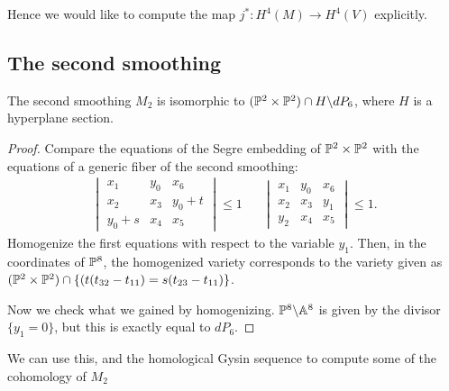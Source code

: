 \documentclass[11pt, english]{article}
\begin{document}
Hence we would like to compute the map $j^\ast: H^4(M) \to H^4(V)$ explicitly.

\subsection{The second smoothing}

\begin{prop}
The second smoothing $M_2$ is isomorphic to $(\mathbb{P}^2 \times \mathbb{P}^2) \cap H \backslash dP_6$, where $H$ is a hyperplane section.
\end{prop}
\begin{proof}
Compare the equations of the Segre embedding of $\mathbb{P}^2 \times \mathbb{P}^2$ with the equations of a generic fiber of the second smoothing:
\begin{align*}
\begin{vmatrix}
x_1 & y_0 & x_6 \\
x_2 & x_3 & y_0+t \\
y_0+s & x_4 & x_5
\end{vmatrix} \le 1
&&
\begin{vmatrix}
x_1 & y_0 & x_6 \\
x_2 & x_3 & y_1 \\
y_2 & x_4 & x_5
\end{vmatrix} \le 1.
\end{align*}
Homogenize the first equations with respect to the variable $y_1$. Then, in the coordinates of $\mathbb{P}^8$, the homogenized variety corresponds to the variety given as $(\mathbb{P}^2 \times \mathbb{P}^2) \cap \{ (t(t_{32}-t_{11})=s(t_{23}-t_{11}) \}$.

Now we check what we gained by homogenizing. $\mathbb{P}^8 \backslash \mathbb{A}^8$ is given by the divisor $\{ y_1 = 0 \}$, but this is exactly equal to $dP_6$.
\end{proof}

We can use this, and the homological Gysin sequence to compute some of the cohomology of $M_2$






\end{document}
